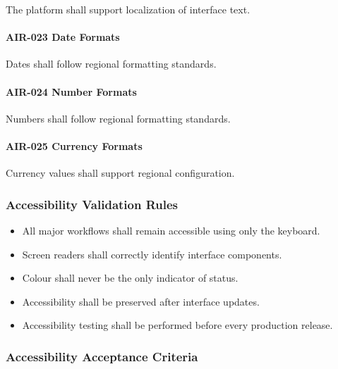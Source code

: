 The platform shall support localization of interface text.

\paragraph{AIR-023 Date Formats}

Dates shall follow regional formatting standards.

\paragraph{AIR-024 Number Formats}

Numbers shall follow regional formatting standards.

\paragraph{AIR-025 Currency Formats}

Currency values shall support regional configuration.


\subsubsection*{Accessibility Validation Rules}

\begin{itemize}

\item All major workflows shall remain accessible using only the keyboard.

\item Screen readers shall correctly identify interface components.

\item Colour shall never be the only indicator of status.

\item Accessibility shall be preserved after interface updates.

\item Accessibility testing shall be performed before every production
release.

\end{itemize}


\subsubsection*{Accessibility Acceptance Criteria}

